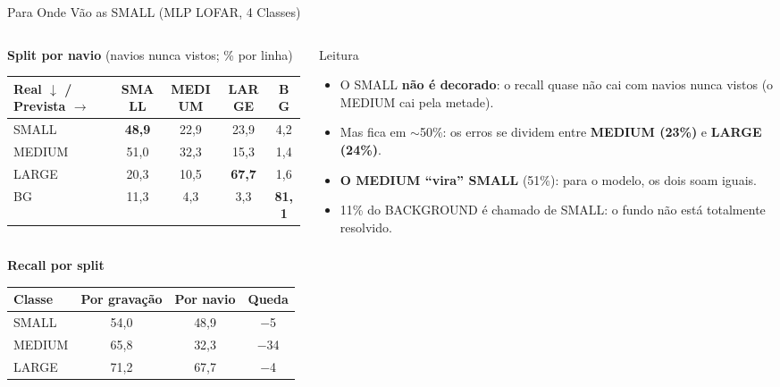 \documentclass[aspectratio=169]{beamer}
\newcommand{\cahi}[1]{\cellcolor{green!30}\textbf{#1}}
\newcommand{\calo}[1]{\cellcolor{red!20}#1}
\begin{document}
\begin{frame}{Para Onde Vão as SMALL (MLP LOFAR, 4 Classes)}
    \footnotesize
    \begin{columns}[T]
        \begin{column}{0.52\textwidth}
            \centering
            \scriptsize
            \textbf{Split por navio} (navios nunca vistos; \% por linha)\\[2pt]
            \setlength{\tabcolsep}{3pt}
            \begin{tabular}{@{}lcccc@{}}
                \toprule
                Real $\downarrow$ / Prevista $\to$ & SMALL & MEDIUM & LARGE & BG \\
                \midrule
                SMALL & \cahi{48,9} & 22,9 & 23,9 & 4,2 \\
                MEDIUM & \calo{51,0} & 32,3 & 15,3 & 1,4 \\
                LARGE & 20,3 & 10,5 & \cahi{67,7} & 1,6 \\
                BG & 11,3 & 4,3 & 3,3 & \cahi{81,1} \\
                \bottomrule
            \end{tabular}\\[6pt]
            \textbf{Recall por split}\\[2pt]
            \begin{tabular}{@{}lccc@{}}
                \toprule
                Classe & Por gravação & Por navio & Queda \\
                \midrule
                SMALL & 54,0 & 48,9 & $-$5 \\
                MEDIUM & 65,8 & 32,3 & \calo{$-$34} \\
                LARGE & 71,2 & 67,7 & $-$4 \\
                \bottomrule
            \end{tabular}
        \end{column}
        \begin{column}{0.46\textwidth}
            \begin{block}{\small Leitura}
                \scriptsize
                \begin{itemize}
                    \setlength{\itemsep}{2pt}
                    \item O SMALL \textbf{não é decorado}: o recall quase não cai com navios nunca vistos (o MEDIUM cai pela metade).
                    \item Mas fica em $\sim$50\%: os erros se dividem entre \textbf{MEDIUM (23\%)} e \textbf{LARGE (24\%)}.
                    \item \textbf{O MEDIUM ``vira'' SMALL} (51\%): para o modelo, os dois soam iguais.
                    \item 11\% do BACKGROUND é chamado de SMALL: o fundo não está totalmente resolvido.
                \end{itemize}
            \end{block}
        \end{column}
    \end{columns}
\end{frame}
\end{document}
